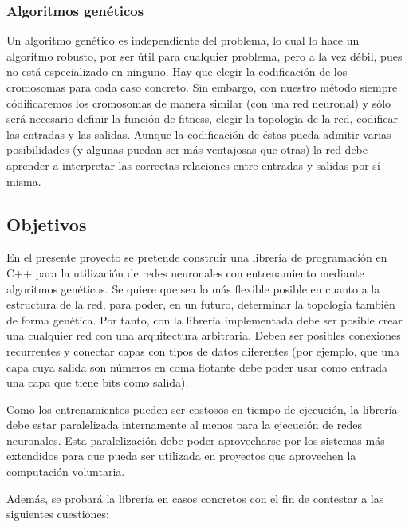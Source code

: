\documentclass[11pt]{article}
\begin{document}
\begin{titlepage}
\subsubsection{Algoritmos gen\'eticos}
\label{sec-3-1-2}

  \label{anaFortYGene}

Un algoritmo gen\'etico es independiente del problema, lo cual lo hace un algoritmo robusto, por ser \'util para cualquier problema, pero a la vez d\'ebil, pues no est\'a especializado en ninguno. Hay que elegir la codificaci\'on de los cromosomas para cada caso concreto. Sin embargo, con nuestro m\'etodo siempre c\'odificaremos los cromosomas de manera similar (con una red neuronal) y s\'olo ser\'a necesario definir la funci\'on de fitness, elegir la topolog\'ia de la red, codificar las entradas y las salidas. Aunque la codificaci\'on de \'estas pueda admitir varias posibilidades (y algunas puedan ser m\'as ventajosas que otras) la red debe aprender a interpretar las correctas relaciones entre entradas y salidas por s\'i misma.
\subsection{Objetivos}
\label{sec-3-2}

  \label{anaObjetivos}

En el presente proyecto se pretende construir una librer\'ia de programaci\'on en C++ para la utilizaci\'on de redes neuronales con entrenamiento mediante algoritmos gen\'eticos. Se quiere que sea lo m\'as flexible posible en cuanto a la estructura de la red, para poder, en un futuro, determinar la topolog\'ia tambi\'en de forma gen\'etica. Por tanto, con la librer\'ia implementada debe ser posible crear una cualquier red con una arquitectura arbitraria. Deben ser posibles conexiones recurrentes y conectar capas con tipos de datos diferentes (por ejemplo, que una capa cuya salida son n\'umeros en coma flotante debe poder usar como entrada una capa que tiene bits como salida).

 Como los entrenamientos pueden ser costosos en tiempo de ejecuci\'on, la librer\'ia debe estar paralelizada internamente al menos para la ejecuci\'on de redes neuronales. Esta paralelizaci\'on debe poder aprovecharse por los sistemas m\'as extendidos para que pueda ser utilizada en proyectos que aprovechen la computaci\'on voluntaria.

 Adem\'as, se probar\'a la librer\'ia en casos concretos con el fin de contestar a las siguientes cuestiones:


\end{titlepage}
\end{document}

